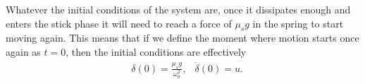 \documentclass[10pt,a4paper,twocolumn]{article}
\begin{document}
Whatever the initial conditions of the system are, once it dissipates enough and enters the stick phase it will need to reach a force of $\mu_s g$ in the spring to start moving again. This means that if we define the moment where motion starts once again as $t=0$, then the initial conditions are effectively
%
\begin{align}
&\delta(0) = \frac{\mu_s g}{\omega_0^2}, &\dot{\delta}(0) = u.
\end{align} 



\cite{oregon}
\cite{apho}
\cite{Prior1719}
\cite{CASTRO20032083}


\printbibliography
\end{document}
